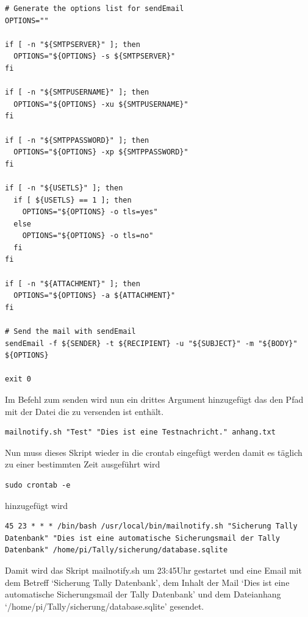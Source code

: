 \documentclass[11pt,a4paper]{article} %
\begin{document}
\begin{frame}
\begin{lstlisting}
# Generate the options list for sendEmail
OPTIONS=""

if [ -n "${SMTPSERVER}" ]; then
  OPTIONS="${OPTIONS} -s ${SMTPSERVER}"
fi

if [ -n "${SMTPUSERNAME}" ]; then
  OPTIONS="${OPTIONS} -xu ${SMTPUSERNAME}"
fi

if [ -n "${SMTPPASSWORD}" ]; then
  OPTIONS="${OPTIONS} -xp ${SMTPPASSWORD}"
fi

if [ -n "${USETLS}" ]; then
  if [ ${USETLS} == 1 ]; then
    OPTIONS="${OPTIONS} -o tls=yes"
  else
    OPTIONS="${OPTIONS} -o tls=no"
  fi
fi

if [ -n "${ATTACHMENT}" ]; then
  OPTIONS="${OPTIONS} -a ${ATTACHMENT}"
fi

# Send the mail with sendEmail
sendEmail -f ${SENDER} -t ${RECIPIENT} -u "${SUBJECT}" -m "${BODY}" ${OPTIONS}

exit 0
\end{lstlisting}
\end{frame}
Im Befehl zum senden wird nun ein drittes Argument hinzugefügt das den Pfad mit der Datei die zu versenden ist enth\"alt.
\begin{frame}

\begin{lstlisting}
mailnotify.sh "Test" "Dies ist eine Testnachricht." anhang.txt

\end{lstlisting}
\end{frame}
\par
Nun muss dieses Skript wieder in die crontab eingefügt werden damit es täglich zu einer bestimmten Zeit ausgeführt wird
\begin{frame}

\begin{lstlisting}
sudo crontab -e

\end{lstlisting}
\end{frame}
hinzugefügt wird
\begin{frame}

\begin{lstlisting}
45 23 * * * /bin/bash /usr/local/bin/mailnotify.sh "Sicherung Tally Datenbank" "Dies ist eine automatische Sicherungsmail der Tally Datenbank" /home/pi/Tally/sicherung/database.sqlite

\end{lstlisting}
\end{frame}
Damit wird das Skript mailnotify.sh um 23:45Uhr gestartet und eine Email mit dem Betreff `Sicherung Tally Datenbank', dem Inhalt der Mail `Dies ist eine automatische Sicherungsmail der Tally Datenbank' und dem Dateianhang `/home/pi/Tally/sicherung/database.sqlite' gesendet.
\end{document}
